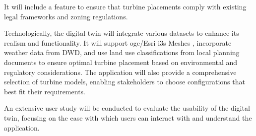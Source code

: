 \documentclass[11pt, titlepage, a4paper]{scrartcl}
\begin{document}
\begin{linenumbers}
    It will include a feature to ensure that turbine placements comply with existing legal frameworks and zoning regulations.

    Technologically, the digital twin will integrate various datasets to enhance its realism and functionality. It will support \gls{ogc}/Esri \gls{i3s} Meshes \cite{esriincI3sspec}, incorporate weather data from DWD, and use land use classifications from local planning documents %
    to ensure optimal turbine placement based on environmental and regulatory considerations. The application will also provide a comprehensive selection of turbine models, enabling stakeholders to choose configurations that best fit their requirements.

    An extensive user study will be conducted to evaluate the usability of the digital twin, focusing on the ease with which users can interact with and understand the application.






\end{linenumbers}
\end{document}
